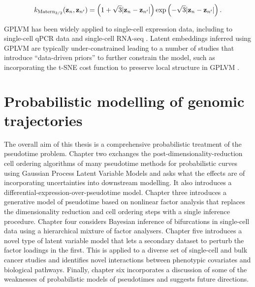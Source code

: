\begin{equation}
  k_{\text{Matern}_{3/2}}(\mathbf{z}_n, \mathbf{z}_{n'}) =
  \left(
  1 + \sqrt{3} \lvert \mathbf{z}_n - \mathbf{z}_{n'} \rvert \right) \exp\left( - \sqrt{3} \lvert \mathbf{z}_n - \mathbf{z}_{n'} \rvert \right).
\end{equation}

GPLVM has been widely applied to single-cell expression data, including to single-cell qPCR data \cite{buettner2012novel} and single-cell RNA-seq \cite{campbell2016order,macaulay2016single}. Latent embeddings inferred using GPLVM are typically under-constrained leading to a number of studies that introduce ``data-driven priors'' to further constrain the model, such as incorporating the t-SNE cost function to preserve local structure in GPLVM \cite{van2009preserving}.

\section{Probabilistic modelling of genomic trajectories}

The overall aim of this thesis is a comprehensive probabilistic treatment of the pseudotime problem. Chapter two exchanges the post-dimensionality-reduction cell ordering algorithms of many pseudotime methods for probabilistic curves using Gaussian Process Latent Variable Models and asks what the effects are of incorporating uncertainties into downstream modelling. It also introduces a differential-expression-over-pseudotime model.
Chapter three introduces a generative model of pseudotime based on nonlinear factor analysis that replaces the dimensionality reduction and cell ordering steps with a single inference procedure.
Chapter four considers Bayesian inference of bifurcations in single-cell data using a hierarchical mixture of factor analysers.
Chapter five introduces a novel type of latent variable model that lets a secondary dataset to perturb the factor loadings in the first. This is applied to a diverse set of single-cell and bulk cancer studies and identifies novel interactions between phenotypic covariates and biological pathways.
Finally, chapter six incorporates a discussion of some of the weaknesses of probabilistic models of pseudotimes and suggests future directions.
